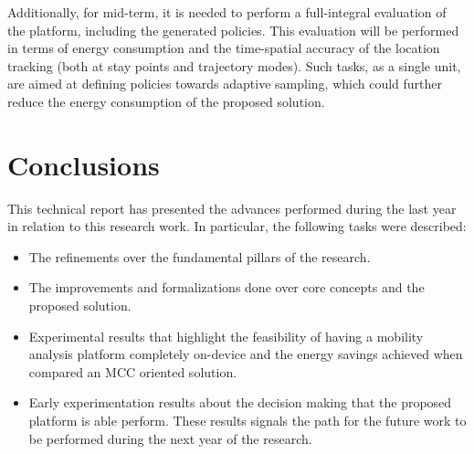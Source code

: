 \documentclass[ENG,PhD]{cinvestav}
\begin{document}
Additionally, for mid-term, it is needed to perform a full-integral evaluation of the platform, including the generated policies.
This evaluation will be performed in terms of energy consumption and the time-spatial accuracy of the location tracking (both at stay points and trajectory modes).
Such tasks, as a single unit, are aimed at defining policies towards adaptive sampling, which could further reduce the energy consumption of the proposed solution.




%                                                                                          
\section{Conclusions}\label{sec:conclusions}
This technical report has presented the advances performed during the last year in relation to this research work.
In particular, the following tasks were described:
\begin{itemize}
  \item The refinements over the fundamental pillars of the research.
  \item The improvements and formalizations done over core concepts and the proposed solution.
  \item Experimental results that highlight the feasibility of having a mobility analysis platform completely on-device and the energy savings achieved when compared an MCC oriented solution.
  \item Early experimentation results about the decision making that the proposed platform is able perform.
  These results signals the path for the future work to be performed during the next year of the research.
\end{itemize}



\end{document}
